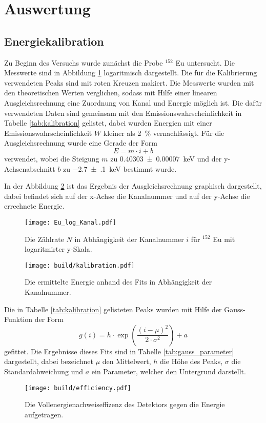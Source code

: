 \newpage
\section{Auswertung}
\label{sec:Auswertung}

\subsection{Energiekalibration}
\label{sec:Energiekalibration}
Zu Beginn des Versuchs wurde zunächst die Probe ${}^{152}$ Eu untersucht. Die Messwerte
sind in Abbildung \ref{fig:Eu_log_Kanal} logaritmisch dargestellt.
Die für die Kalibrierung verwendeten Peaks sind mit roten Kreuzen makiert. Die Messwerte
wurden mit den theoretischen Werten verglichen, sodass mit Hilfe einer linearen Ausgleichsrechnung
eine Zuordnung von Kanal und Energie möglich ist. Die dafür verwendeten Daten sind
gemeinsam mit den Emissionswahrscheinlichkeit in Tabelle \ref{tab:kalibration}
gelistet, dabei wurden Energien mit einer Emissionswahrscheinlichkeit $W$
kleiner als \SI{2}{\percent} vernachlässigt. Für die Ausgleichsrechnung wurde
eine Gerade der Form
\begin{equation}
  E = m \cdot i + b
\end{equation}
verwendet, wobei die Steigung $m$ zu \SI{0.40303(7)}{\kilo\electronvolt} und der
y-Achsenabschnitt $b$ zu \SI{-2.7(1)}{\kilo\electronvolt} bestimmt wurde.

In der Abbildung \ref{fig:kalibration} ist das Ergebnis der Ausgleichsrechnung graphisch
dargestellt, dabei befindet sich auf der x-Achse die Kanalnummer und auf der
y-Achse die errechnete Energie.

\begin{figure}
 \centering
 \texttt{[image: Eu\_log\_Kanal.pdf]}
 \caption{Die Zählrate $N$ in Abhängigkeit der Kanalnummer $i$ für ${}^{152}$ Eu mit logaritmirter y-Skala.}
 \label{fig:Eu_log_Kanal}
\end{figure}

\begin{figure}
 \centering
 \texttt{[image: build/kalibration.pdf]}
 \caption{Die ermittelte Energie anhand des Fits in Abhängigkeit der Kanalnummer.}
 \label{fig:kalibration}
\end{figure}




Die in Tabelle \ref{tab:kalibration} gelisteten Peaks wurden mit Hilfe der
Gauss-Funktion der Form
\begin{equation}
  g(i) = h \cdot \exp{\left(\frac{\left(i - \mu\right)^2}{2 \cdot \sigma^2}\right)} + a
\end{equation}
gefittet. Die Ergebnisse dieses Fits sind in Tabelle \ref{tab:gauss_parameter}
dargestellt, dabei bezeichnet $\mu$ den Mittelwert, $h$ die Höhe des Peaks, $\sigma$
die Standardabweichung und $a$ ein Parameter, welcher den Untergrund darstellt.
\begin{figure}
 \centering
 \texttt{[image: build/efficiency.pdf]}
 \caption{Die Vollenergienachweiseffizenz des Detektors gegen die Energie aufgetragen.}
 \label{fig:effizenz}
\end{figure}


